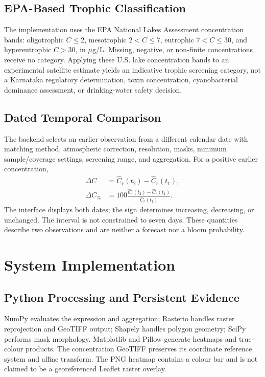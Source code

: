\documentclass[conference]{IEEEtran}
\begin{document}
\subsection{EPA-Based Trophic Classification}
The implementation uses the EPA National Lakes Assessment concentration bands\cite{epa}: oligotrophic $C\leq2$, mesotrophic $2<C\leq7$, eutrophic $7<C\leq30$, and hypereutrophic $C>30$, in $\mu$g/L. Missing, negative, or non-finite concentrations receive no category. Applying these U.S. lake concentration bands to an experimental satellite estimate yields an indicative trophic screening category, not a Karnataka regulatory determination, toxin concentration, cyanobacterial dominance assessment, or drinking-water safety decision.

\subsection{Dated Temporal Comparison}
The backend selects an earlier observation from a different calendar date with matching method, atmospheric correction, resolution, masks, minimum sample/coverage settings, screening range, and aggregation. For a positive earlier concentration,
\begin{align}
\Delta C&=\widehat C_r(t_2)-\widehat C_r(t_1),\\
\Delta C_{\%}&=100\frac{\widehat C_r(t_2)-\widehat C_r(t_1)}{\widehat C_r(t_1)}.
\end{align}
The interface displays both dates; the sign determines increasing, decreasing, or unchanged. The interval is not constrained to seven days. These quantities describe two observations and are neither a forecast nor a bloom probability.

\section{System Implementation}
\subsection{Python Processing and Persistent Evidence}
NumPy evaluates the expression and aggregation; Rasterio handles raster reprojection and GeoTIFF output; Shapely handles polygon geometry; SciPy performs mask morphology. Matplotlib and Pillow generate heatmaps and true-colour products. The concentration GeoTIFF preserves its coordinate reference system and affine transform. The PNG heatmap contains a colour bar and is not claimed to be a georeferenced Leaflet raster overlay.
\end{document}
